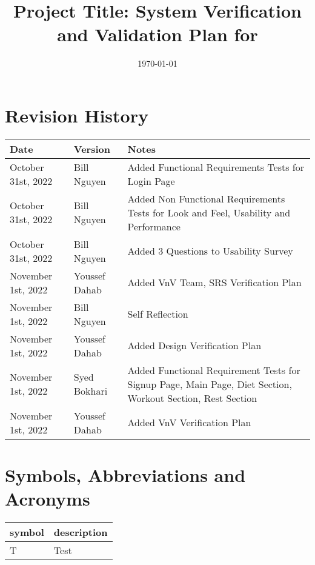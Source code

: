 \documentclass[12pt, titlepage]{article}
\begin{document}
\title{Project Title: System Verification and Validation Plan for \progname{}} 
\author{\authname}
\date{\today}

\maketitle


\section{Revision History}

\begin{tabularx}{\textwidth}{p{3cm}p{2cm}X}
	\toprule {\bf Date} & {\bf Version} & {\bf Notes}\\
	\midrule
	October 31st, 2022 & Bill Nguyen & Added Functional Requirements Tests for Login Page\\
	October 31st, 2022 & Bill Nguyen & Added Non Functional Requirements Tests for Look and Feel, Usability and Performance\\
	October 31st, 2022 & Bill Nguyen & Added 3 Questions to Usability Survey\\
	November 1st, 2022 & Youssef Dahab & Added VnV Team, SRS Verification Plan\\
	November 1st, 2022 & Bill Nguyen & Self Reflection\\
	November 1st, 2022 & Youssef Dahab & Added Design Verification Plan\\
	November 1st, 2022 & Syed Bokhari & Added Functional Requirement Tests for Signup Page, Main Page, Diet Section, Workout Section, Rest Section\\
	November 1st, 2022 & Youssef Dahab & Added VnV Verification Plan\\
	\bottomrule
\end{tabularx}

\newpage

\tableofcontents

\listoftables
{}

\listoffigures
{}

\newpage

\section{Symbols, Abbreviations and Acronyms}

\renewcommand{\arraystretch}{1.2}
\begin{tabular}{l l} 
	\toprule		
	\textbf{symbol} & \textbf{description}\\
	\midrule 
	T & Test\\
	\bottomrule
\end{tabular}\\
\end{document}
